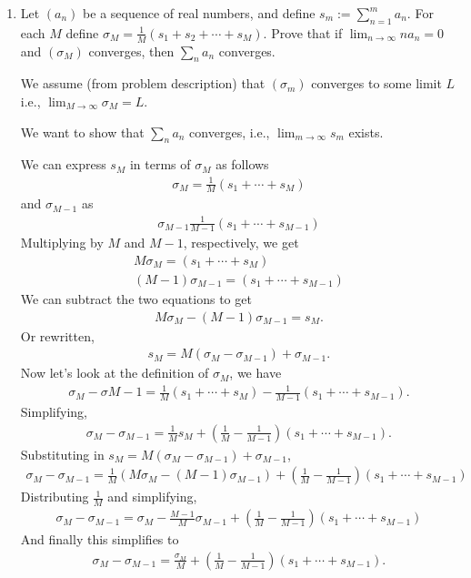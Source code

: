 \documentclass [10pt]{article}
\newcommand{\jg}[1]{{\color{blue} #1}}
\begin{document}
\begin{enumerate}
\clearpage
\item Let $\left(a_n\right)$ be a sequence of real numbers, and define $s_m:= \sum_{n=1}^m a_n$. For each $M$ define $\sigma_M=\frac{1}{M} \left(s_1+s_2+\cdots+s_M\right)$. Prove that if $\lim_{n \to \infty} n a_n =0$ and $(\sigma_M)$ converges, then $\sum_n a_n$ converges.

\jg{
We assume (from problem description) that $(\sigma_m)$ converges to some limit $L$ i.e., $\lim_{M\rightarrow \infty} \sigma_M = L$. 

We want to show that $\sum_n a_n$ converges, i.e., $\lim_{m\rightarrow \infty} s_m$ exists. 

We can express $s_M$ in terms of $\sigma_M$ as follows
\begin{align*}
    \sigma_M = \frac{1}{M} (s_1 + \cdots + s_M) 
\end{align*}
and $\sigma_{M-1}$ as 
\begin{align*}
    \sigma_{M-1} \frac{1}{M-1} (s_1 + \cdots + s_{M-1})
\end{align*}
Multiplying by $M$ and $M-1$, respectively, we get
\begin{align*}
    M \sigma_M = (s_1 + \cdots + s_M) \\
    (M-1) \sigma_{M-1} = (s_1 + \cdots + s_{M-1})
\end{align*}
We can subtract the two equations to get
\begin{align*}
    M \sigma_M - (M-1)\sigma_{M-1} = s_M.
\end{align*}
Or rewritten,
\begin{align*}
    s_M = M(\sigma_M - \sigma_{M-1}) + \sigma_{M-1}. 
\end{align*}
Now let's look at the definition of $\sigma_M$, we have 
\begin{align*}
    \sigma_M - \sigma{M-1} = \frac{1}{M}(s_1 + \cdots + s_M ) - \frac{1}{M-1} (s_1 + \cdots + s_{M-1}). 
\end{align*}
Simplifying, 
\begin{align*}
    \sigma_M - \sigma_{M-1} = \frac{1}{M} s_M + \left( \frac{1}{M} - \frac{1}{M-1}\right) (s_1 + \cdots + s_{M-1}). 
\end{align*}
Substituting in $s_M = M(\sigma_M - \sigma_{M-1}) + \sigma_{M-1}$, 
\begin{align*}
    \sigma_M - \sigma_{M-1} = \frac{1}{M} (M \sigma_M - (M-1) \sigma_{M-1} ) + \left( \frac{1}{M} - \frac{1}{M-1} \right) (s_1 + \cdots + s_{M-1})
\end{align*}
Distributing $\frac{1}{M}$ and simplifying,
\begin{align*}
    \sigma_M - \sigma_{M-1} = \sigma_M - \frac{M-1}{M} \sigma_{M-1} + \left( \frac{1}{M} - \frac{1}{M-1}  \right) (s_1 + \cdots + s_{M-1}) 
\end{align*}
And finally this simplifies to 
\begin{align*}
    \sigma_M - \sigma_{M-1} = \frac{\sigma_M}{M} + \left( \frac{1}{M} - \frac{1}{M-1}  \right) (s_1 + \cdots + s_{M-1}) .
\end{align*}

}
\end{enumerate}
\end{document}
